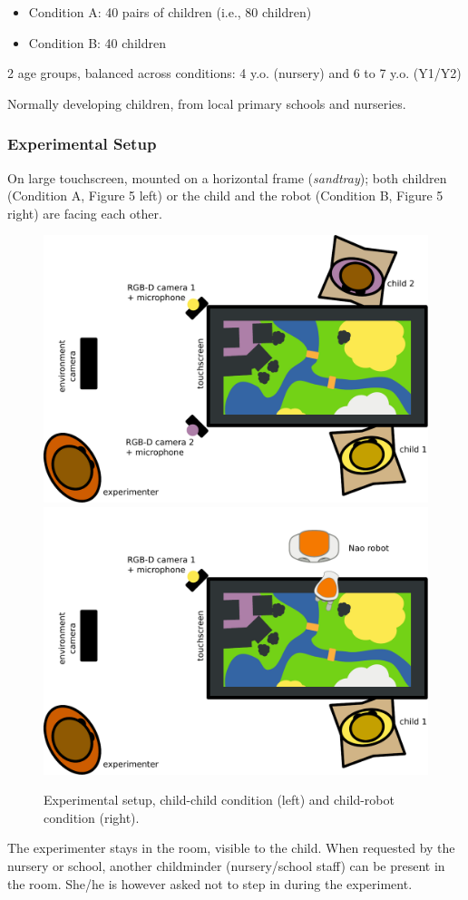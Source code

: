\documentclass{article}
\begin{document}
\begin{itemize}
\item
  Condition A: 40 pairs of children (i.e., 80 children)
\item
  Condition B: 40 children
\end{itemize}

2 age groups, balanced across conditions: 4 y.o. (nursery) and 6 to 7
y.o. (Y1/Y2)

Normally developing children, from local primary schools and nurseries.



\subsubsection{Experimental Setup}\label{experimental-setup}

On large touchscreen, mounted on a horizontal frame (\emph{sandtray});
both children (Condition A, Figure 5 left) or the child and the robot
(Condition B, Figure 5 right) are facing each other.

\begin{figure}[htbp]
    \centering
    \includegraphics[width=0.4\linewidth]{setup_child_child_top}
    \hspace{1.5cm}
    \includegraphics[width=0.4\linewidth]{setup_child_robot_top}
    \caption{Experimental setup, child-child condition (left) and child-robot
    condition (right).}
\end{figure}

The experimenter stays in the room, visible to the child. When
requested by the nursery or school, another childminder (nursery/school
staff) can be present in the room. She/he is however asked not to step
in during the experiment.
\end{document}
